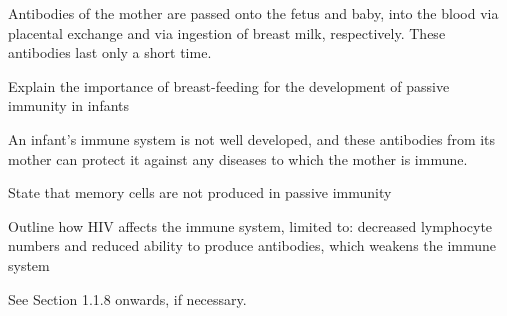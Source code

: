 Antibodies of the mother are passed onto the fetus and baby, into the blood via placental exchange
and via ingestion of breast milk, respectively. These antibodies last only a short time.

\begin{point}
Explain the importance of breast-feeding for the development of passive immunity in infants
\end{point}

An infant's immune system is not well developed, and these antibodies from its mother can
protect it against any diseases to which the mother is immune.

\begin{point}
State that memory cells are not produced in passive immunity
\end{point}

\begin{point}
Outline how HIV affects the immune system, limited to: decreased lymphocyte numbers and reduced 
ability to produce antibodies, which weakens the immune system
\end{point}

See Section 1.1.8 onwards, if necessary.
